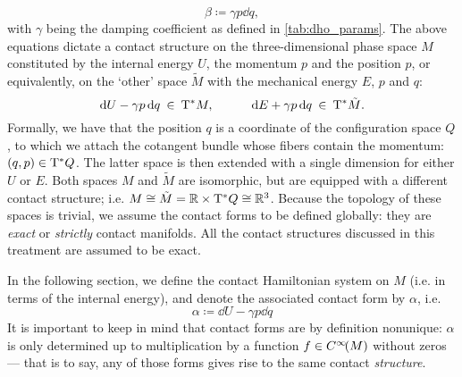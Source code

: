 \begin{equation}
    \beta \coloneq \gamma p \dd{q},
    \label{eq:dho_work_form}
\end{equation}
with $\gamma$ being the damping coefficient as defined in \cref{tab:dho_params}. The above equations dictate a contact structure on the three-dimensional phase space $M$ constituted by the internal energy $U$, the momentum $p$ and the position $p$, or equivalently, on the `other' space $\tilde{M}$ with the mechanical energy $E$, $p$ and $q$:
$$ \dd{U} - \gamma p \dd{q} \: \in \: \mathrm{T}^*M, \qquad \quad \dd{E} + \gamma p \dd{q} \: \in \: \mathrm{T}^*\tilde{M}. $$
Formally, we have that the position $q$ is a coordinate of the configuration space $Q$, to which we attach the cotangent bundle whose fibers contain the momentum: $ (q, p) \in \mathrm{T}^*Q$. The latter space is then extended with a single dimension for either $U$ or $E$. Both spaces $M$ and $\tilde{M}$ are isomorphic, but are equipped with a different contact structure; i.e. $M \cong \tilde{M} = \mathbb{R} \times \mathrm{T}^*Q \cong \mathbb{R}^3$. Because the topology of these spaces is trivial, we assume the contact forms to be defined globally: they are \emph{exact} or \emph{strictly} contact manifolds. All the contact structures discussed in this treatment are assumed to be exact.

In the following section, we define the contact Hamiltonian system on $M$ (i.e. in terms of the internal energy), and denote the associated contact form by $\alpha$, i.e.
\begin{equation}
    \alpha \coloneq \dd{U} - \gamma p \dd{q}
    \label{eq:dho_contact_form_thermo}
\end{equation}
It is important to keep in mind that contact forms are by definition nonunique: $\alpha$ is only determined up to multiplication by a function $f \in C^\infty\!\qty(M)$ without zeros --- that is to say, any of those forms gives rise to the same contact \emph{structure}.

